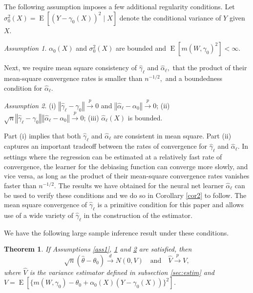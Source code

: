 \documentclass[aos]{imsart}
\numberwithin{equation}{section}
\theoremstyle{plain}
\newtheorem{theorem}{Theorem}[section]
\theoremstyle{remark}
\newtheorem{assumption}{Assumption}
\DeclareMathOperator{\E}{E}
\begin{document}
The following assumption imposes a few additional regularity conditions. Let $\sigma_0^2(X) = \E[(Y - \gamma_0(X))^2 \mid X]$ denote the conditional variance of $Y$ given $X$.

\begin{assumption}\label{ass3} 
$\alpha_0(X)$ and $\sigma^2_0(X)$ are bounded and $\E[m(W, \gamma_0)^2] < \infty$.
\end{assumption}

Next, we require mean square consistency of $\hat{\gamma}_{\ell}$ and $\hat{\alpha}_{\ell},$ that the product of their mean-square convergence rates is smaller than $n^{-1/2},$ and a boundedness condition for $\hat{\alpha}_{\ell}$.

\begin{assumption}\label{ass4}
(i) $\left\Vert \hat{\gamma}_{\ell}-\gamma_{0}\right\Vert \overset{p}{\to}0$ and $\left\Vert\hat{\alpha}_{\ell}-\alpha_{0}\right\Vert \overset{p}{\to}0$; (ii) $\sqrt{n}\left\Vert \hat{\gamma}_{\ell}-\gamma_{0}\right\Vert \left\Vert \hat{\alpha}_{\ell}-\alpha_{0}\right\Vert\overset{p}{\to}0$; (iii)  $\hat{\alpha}_{\ell}(X)$ is bounded.
\end{assumption}

Part (i) implies that both $\hat{\gamma}_\ell$ and $\hat{\alpha}_\ell$ are consistent in mean square. Part (ii) captures an important tradeoff between the rates of convergence for $\hat{\gamma}_\ell$ and $\hat{\alpha}_\ell$. In settings where the regression can be estimated at a relatively fast rate of convergence, the learner for the debiasing function can converge more slowly, and vice versa, as long as the product of their mean-square convergence rates vanishes faster than $n^{-1/2}$. The results we have obtained for the neural net learner $\hat{\alpha}_{\ell}$ can be used to verify these conditions and we do so in Corollary \ref{cor2} to follow. The mean square convergence of $\hat{\gamma}_{\ell}$ is a primitive condition for this paper and allows use of a wide variety of $\hat{\gamma}_{\ell}$ in the construction of the estimator.

We have the following large sample inference result under these conditions.
\begin{theorem}\label{thm2}
    If Assumptions \ref{ass1}, \ref{ass3} and \ref{ass4} are satisfied, then
    \[
    \sqrt{n}(\hat{\theta}-\theta_{0})\overset{d}{\to}N(0,V)\quad\text{and}\quad\hat{V}\overset{p}{\to}V,
    \]
where $\hat V$ is the variance estimator defined in subsection \ref{sec:estim} and $V=\E[\{m(W,\gamma_{0})-\theta_{0}+\alpha_{0}(X)(Y - \gamma_0(X))\}^{2}]$.
\end{theorem}
\end{document}
